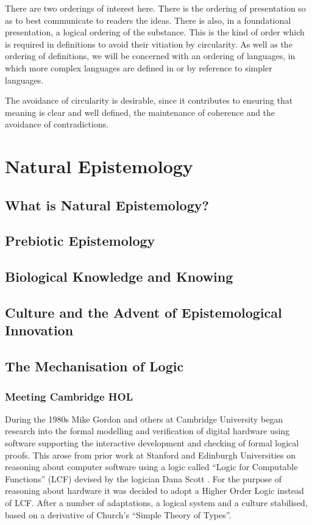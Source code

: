 \documentclass[10pt,titlepage]{book}
\begin{document}
There are two orderings of interest here.
There is the ordering of presentation so as to best communicate to readers the ideas.
There is also, in a foundational presentation, a logical ordering of the substance.
This is the kind of order which is required in definitions to avoid their vitiation by circularity.
As well as the ordering of definitions, we will be concerned with an ordering of languages, in which more complex languages are defined in or by reference to simpler languages.

The avoidance of circularity is desirable, since it contributes to ensuring that meaning is clear and well defined, the maintenance of coherence and the avoidance of contradictions.

\part{Natural Epistemology}

\chapter{What is Natural Epistemology?}

\chapter{Prebiotic Epistemology}

\chapter{Biological Knowledge and Knowing}

\chapter{Culture and the Advent of Epistemological Innovation}

\chapter{The Mechanisation of Logic}

\section{Meeting Cambridge HOL}

During the 1980s Mike Gordon and others at Cambridge University began research into the formal modelling and verification of digital hardware using software supporting the interactive development and checking of formal logical proofs.
This arose from prior work at Stanford and Edinburgh Universities on reasoning about computer software using a logic called ``Logic for Computable Functions'' (LCF) devised by the logician Dana Scott \cite{scott1993type}.
For the purpose of reasoning about hardware it was decided to adopt a Higher Order Logic instead of LCF.
After a number of adaptations, a logical system and a culture stabilised, based on a derivative of Church's ``Simple Theory of Types''\cite{churchSTT}.
\end{document}
